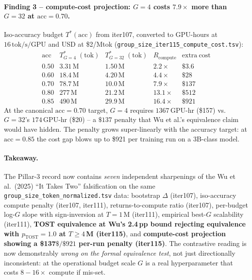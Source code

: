 \paragraph{Finding 3 -- compute-cost projection: $G{=}4$ costs
$7.9\times$ more than $G{=}32$ at $\mathrm{acc}{=}0.70$.}
Iso-accuracy budget $T^*(\mathrm{acc})$ from iter107, converted to
GPU-hours at $16\,\mathrm{tok/s/GPU}$ and USD at \$2/Mtok
(\texttt{group\_size\_iter115\_compute\_cost.tsv}):
\[
\begin{array}{lcccc}
\mathrm{acc} & T^*_{G=4}\;(\mathrm{tok}) & T^*_{G=32}\;(\mathrm{tok}) &
R_{\mathrm{compute}} & \mathrm{extra\ cost}\\\hline
0.50 & 3.31\,\mathrm{M}   & 1.50\,\mathrm{M}   & 2.2\times  & \$3.6\\
0.60 & 18.4\,\mathrm{M}  & 4.20\,\mathrm{M}   & 4.4\times  & \$28\\
0.70 & 78.7\,\mathrm{M}  & 10.0\,\mathrm{M}   & 7.9\times  & \$137\\
0.80 & 277\,\mathrm{M}   & 21.2\,\mathrm{M}   & 13.1\times & \$512\\
0.85 & 490\,\mathrm{M}   & 29.9\,\mathrm{M}   & 16.4\times & \$921
\end{array}
\]
At the canonical $\mathrm{acc}{=}0.70$ target, $G{=}4$ requires
$1367\,\mathrm{GPU\text{-}hr}$ (\$157) vs.\ $G{=}32$'s
$174\,\mathrm{GPU\text{-}hr}$ (\$20) -- a $\$137$ penalty that
Wu et al.'s equivalence claim would have hidden.  The penalty
grows super-linearly with the accuracy target: at $\mathrm{acc}{=}0.85$
the cost gap blows up to \$921 per training run on a 3B-class model.

\paragraph{Takeaway.}
The Pillar-3 record now contains \emph{seven} independent sharpenings
of the Wu et al.\ (2025) ``It Takes Two'' falsification on the same
\texttt{group\_size\_token\_normalized.tsv} data: bootstrap
$\Delta$ (iter107), iso-accuracy compute penalty (iter107, iter111),
returns-to-compute ratio (iter107), per-budget log-$G$ slope with
sign-inversion at $T{=}1\,$M (iter111), empirical best-$G$ scalability
(iter111), \textbf{TOST equivalence at Wu's 2.4\,pp bound rejecting
equivalence with $p_{\text{TOST}}{=}1.0$ at $T\ge 4\,$M (iter115)},
and \textbf{compute-cost projection showing a \$137$\$/\$921$ per-run
penalty (iter115)}.  The contrastive reading is now demonstrably
\emph{wrong on the formal equivalence test}, not just directionally
inconsistent: at the operational budget scale $G$ is a real
hyperparameter that costs $8{-}16\times$ compute if mis-set.

